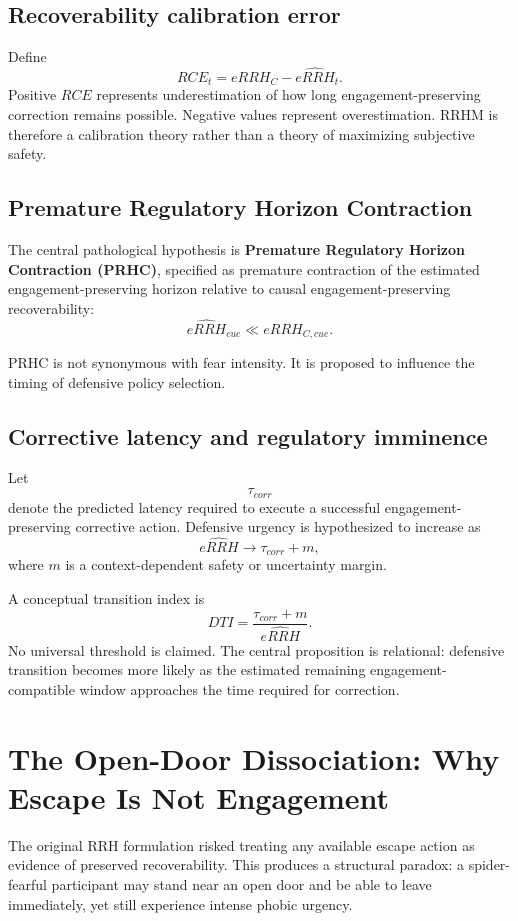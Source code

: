 \documentclass[11pt]{article}
\begin{document}
\subsection{Recoverability calibration error}
Define
\[
RCE_t=eRRH_C-\widehat{eRRH}_t.
\]
Positive $RCE$ represents underestimation of how long engagement-preserving correction remains possible. Negative values represent overestimation. RRHM is therefore a calibration theory rather than a theory of maximizing subjective safety.

\subsection{Premature Regulatory Horizon Contraction}
The central pathological hypothesis is \textbf{Premature Regulatory Horizon Contraction (PRHC)}, specified as premature contraction of the estimated engagement-preserving horizon relative to causal engagement-preserving recoverability:
\[
\widehat{eRRH}_{cue}\ll eRRH_{C,cue}.
\]

PRHC is not synonymous with fear intensity. It is proposed to influence the timing of defensive policy selection.

\subsection{Corrective latency and regulatory imminence}
Let
\[
\tau_{corr}
\]
denote the predicted latency required to execute a successful engagement-preserving corrective action. Defensive urgency is hypothesized to increase as
\[
\widehat{eRRH}\rightarrow \tau_{corr}+m,
\]
where $m$ is a context-dependent safety or uncertainty margin.

A conceptual transition index is
\[
DTI=\frac{\tau_{corr}+m}{\widehat{eRRH}}.
\]
No universal threshold is claimed. The central proposition is relational: defensive transition becomes more likely as the estimated remaining engagement-compatible window approaches the time required for correction.

\section{The Open-Door Dissociation: Why Escape Is Not Engagement}
The original RRH formulation risked treating any available escape action as evidence of preserved recoverability. This produces a structural paradox: a spider-fearful participant may stand near an open door and be able to leave immediately, yet still experience intense phobic urgency.
\end{document}
